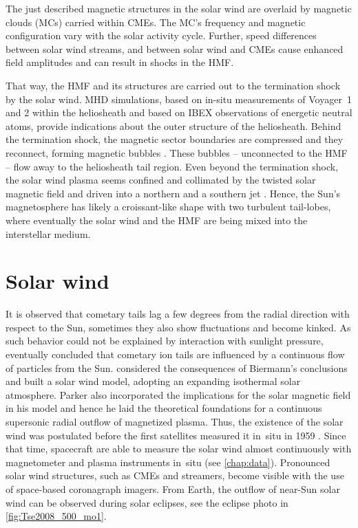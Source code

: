 The just described magnetic structures in the solar wind are overlaid by magnetic clouds (MCs) carried within CMEs. The MC's frequency and magnetic configuration vary with the solar activity cycle. Further, speed differences between solar wind streams, and between solar wind and CMEs cause enhanced field amplitudes and can result in shocks in the HMF.

That way, the HMF and its structures are carried out to the termination shock by the solar wind. MHD simulations, based on in-situ measurements of Voyager~1 and 2 within the heliosheath and based on IBEX observations of energetic neutral atoms, provide indications about the outer structure of the heliosheath. Behind the termination shock, the magnetic sector boundaries are compressed and they reconnect, forming magnetic bubbles \citep{Opher2011}. These bubbles -- unconnected to the HMF -- flow away to the heliosheath tail region. Even beyond the termination shock, the solar wind plasma seems confined and collimated by the twisted solar magnetic field and driven into a northern and a southern jet \citep{Opher2015}. Hence, the Sun's magnetosphere has likely a croissant-like shape with two turbulent tail-lobes, where eventually the solar wind and the HMF are being mixed into the interstellar medium.


\section{Solar wind}
\label{sec:solar_wind}
It is observed that cometary tails lag a few degrees from the radial direction with respect to the Sun, sometimes they also show fluctuations and become kinked. As such behavior could not be explained by interaction with sunlight pressure, eventually \citet{Biermann1951} concluded that cometary ion tails are influenced by a continuous flow of particles from the Sun.	%
\citet{Parker1958} considered the consequences of Biermann's conclusions and built a solar wind model, adopting an expanding isothermal solar atmosphere. Parker also incorporated the implications for the solar magnetic field in his model and hence he laid the theoretical foundations for a continuous supersonic radial outflow of magnetized plasma. Thus, the existence of the solar wind was postulated before the first satellites measured it in~situ in 1959 \citep{Gringauz1960,Neugebauer1966}. Since that time, spacecraft are able to measure the solar wind almost continuously with magnetometer and plasma instruments in~situ (see \autoref{chap:data}). Pronounced solar wind structures, such as CMEs and streamers, become visible with the use of space-based coronagraph imagers. From Earth, the outflow of near-Sun solar wind can be observed during solar eclipses, see the eclipse photo in \autoref{fig:Tse2008_500_mo1}.

